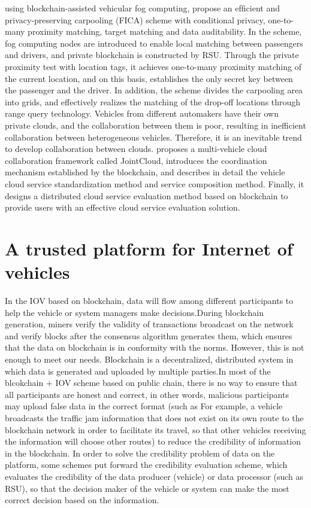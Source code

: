 using blockchain-assisted vehicular fog computing, \cite{ref32} propose an efﬁcient and privacy-preserving carpooling (FICA) scheme with conditional privacy, one-to-many proximity matching, target matching and data auditability.  In the scheme, fog computing nodes are introduced to enable local matching between passengers and drivers, and private blockchain is constructed by RSU. Through the private proximity test with location tags, it achieves one-to-many proximity matching of the current location, and on this basis, establishes the only secret key between the passenger and the driver. In addition, the scheme divides the carpooling area into grids, and effectively realizes the matching of the drop-off locations through range query technology.
Vehicles from different automakers have their own private clouds, and the collaboration between them is poor, resulting in inefficient collaboration between heterogeneous vehicles. Therefore, it is an inevitable trend to develop collaboration between clouds. \cite{ref36} proposes a multi-vehicle cloud collaboration framework called JointCloud, introduces the coordination mechanism established by the blockchain, and describes in detail the vehicle cloud service standardization method and service composition method. Finally, it designs a distributed cloud service evaluation method based on blockchain to provide users with an effective cloud service evaluation solution.

\section{A trusted platform for Internet of vehicles }

In the IOV based on blockchain, data will flow among different participants to help the vehicle or system managers make decisions.During blockchain generation, miners verify the validity of transactions broadcast on the network and verify blocks after the consensus algorithm generates them, which ensures that the data on  blockchain is in conformity with the norms. However, this is not enough to meet our needs. Blockchain is a decentralized, distributed system in which data is generated and uploaded by multiple parties.In most of the blcokchain + IOV scheme based on public chain, there is no way to ensure that all participants are honest and correct, in other words, malicious participants may upload false data in the correct format (such as For example, a vehicle broadcasts the traffic jam information that does not exist on its own route to the blockchain network in order to facilitate its travel, so that other vehicles receiving the information will choose other routes) to reduce the credibility of information in the blockchain. In order to solve the credibility problem of data on the platform, some schemes put forward the credibility evaluation scheme, which evaluates the credibility of the data producer (vehicle) or data processor (such as RSU), so that the decision maker of the vehicle or system can make the most correct decision based on the information.


